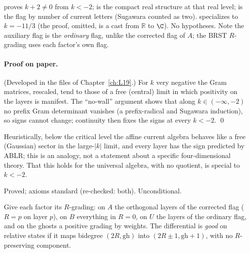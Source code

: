 \begin{dictionary}
 proves $k+2\ne0$ from $k<-2$;  is the compact real structure at that real level;
 is the flag by number of current letters (Sugawara counted as two).  specializes to $k=-11/3$
(the proof, omitted, is a cast from $\mathbb R$ to $\C$). No hypotheses. Note the auxiliary flag is the \emph{ordinary} flag, unlike the corrected flag of
$A$; the BRST $R$-grading uses each factor's own flag.
\end{dictionary}

\paragraph{Proof on paper.} (Developed in the files of Chapter~\ref{ch:L19}.) For $k$ very negative the Gram matrices, rescaled, tend to those of
a free (central) limit in which positivity on the layers is manifest. The ``no-wall'' argument shows that along $k\in(-\infty,-2)$ no prefix Gram
determinant vanishes (a prefix-radical and Sugawara induction), so signs cannot change; continuity then fixes the signs at every $k<-2$.
\qed

\begin{physics}
Heuristically, below the critical level the affine current algebra behaves like a free (Gaussian) sector in the large-$|k|$ limit, and every
layer has the sign predicted by ABLR; this is an analogy, not a statement about a specific four-dimensional theory. That this holds for the universal algebra, with no quotient, is special to $k<-2$.
\end{physics}

\begin{status}
Proved; axioms standard (re-checked: both). Unconditional.
\end{status}

\begin{definition}\label{l28:def:good}
Give each factor its $R$-grading: on $A$ the orthogonal layers of the corrected flag ($R=p$ on layer $p$), on $B$ everything in $R=0$, on $U$ the
layers of the ordinary flag, and on the ghosts a positive grading by weights. The differential is \emph{good} on relative states if it maps
bidegree $(2R,\mathrm{gh})$ into $(2R\pm1,\mathrm{gh}+1)$, with no $R$-preserving component.
\end{definition}

